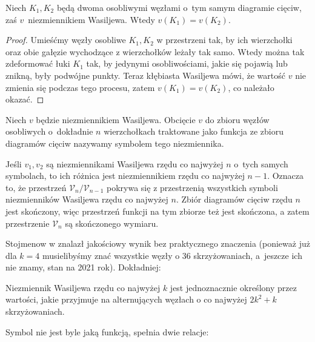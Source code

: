 
\begin{proposition}
    Niech $K_1, K_2$ będą dwoma osobliwymi węzłami o~tym samym diagramie cięciw, zaś $v$~niezmiennikiem Wasiljewa.
    Wtedy $v(K_1) = v(K_2)$.
\end{proposition}

\begin{proof}
    Umieśćmy węzły osobliwe $K_1, K_2$ w przestrzeni tak, by ich wierzchołki oraz obie gałęzie wychodzące z wierzchołków leżały tak samo. Wtedy można tak zdeformować łuki $K_1$ tak, by jedynymi osobliwościami, jakie się pojawią lub znikną, były podwójne punkty.
    Teraz kłębiasta Wasiljewa mówi, że wartość $v$ nie zmienia się podczas tego procesu, zatem $v(K_1) = v(K_2)$, co należało okazać.
\end{proof}

\begin{definition}
%
    Niech $v$ będzie niezmiennikiem Wasiljewa.
    Obcięcie $v$ do zbioru węzłów osobliwych o~dokładnie $n$ wierzchołkach traktowane jako funkcja ze zbioru diagramów cięciw nazywamy symbolem tego niezmiennika.
\end{definition}

Jeśli $v_1, v_2$ są niezmiennikami Wasiljewa rzędu co najwyżej $n$ o~tych samych symbolach, to ich różnica jest niezmiennikiem rzędu co najwyżej $n - 1$.
Oznacza to, że przestrzeń $\mathcal V_n/\mathcal V_{n-1}$ pokrywa się z przestrzenią wszystkich symboli niezmienników Wasiljewa rzędu co najwyżej $n$.
Zbiór diagramów cięciw rzędu $n$ jest skończony, więc przestrzeń funkcji na tym zbiorze też jest skończona, a zatem przestrzenie $\mathcal V_n$ są skończonego wymiaru.

Stojmenow w \cite{stoimenow001} znalazł jakościowy wynik bez praktycznego znaczenia (ponieważ już dla $k = 4$ musielibyśmy znać wszystkie węzły o 36 skrzyżowaniach, a~jeszcze ich nie znamy, stan na 2021 rok).
%
Dokładniej:

\begin{proposition}
    Niezmiennik Wasiljewa rzędu co najwyżej $k$ jest jednoznacznie określony przez wartości, jakie przyjmuje na alternujących węzłach o co najwyżej $2k^2 + k$ skrzyżowaniach.
\end{proposition}

Symbol nie jest byle jaką funkcją, spełnia dwie relacje:
%
\begin{comment}
\begin{figure}[H]
    \[
        \LargeOneTerm \mapsto 0
    \]
    \caption{Relacja ,,one-term'' (1T albo FI?)}
\end{figure}
oraz
\begin{figure}[H]
    \[
        \LargeFourTermA - \LargeFourTermB + \LargeFourTermC - \LargeFourTermD \mapsto 0.
    \]
    \caption{Relacja ,,four-term'' (4T)}
\end{figure}
\end{comment}


